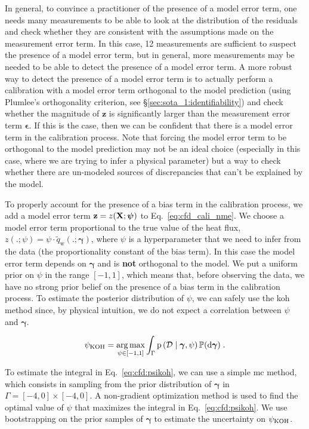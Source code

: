 \smallskip
In general, to convince a practitioner of the presence of a model error term, one needs many measurements to be able to look at the distribution of the residuals and check whether they are consistent with the assumptions made on the measurement error term. In this case, 12 measurements are sufficient to suspect the presence of a model error term, but in general, more measurements may be needed to be able to detect the presence of a model error term. A more robust way to detect the presence of a model error term is to actually perform a calibration with a model error term orthogonal to the model prediction (using Plumlee's orthogonality criterion, see \S\ref{sec:sota_1:identifiability}) and check whether the magnitude of $\mathbf{z}$ is significantly larger than the measurement error term $\boldsymbol{\epsilon}$. If this is the case, then we can be confident that there is a model error term in the calibration process. Note that forcing the model error term to be orthogonal to the model prediction may not be an ideal choice (especially in this case, where we are trying to infer a physical parameter) but a way to check whether there are un-modeled sources of discrepancies that can't be explained by the model.


\bigskip
To properly account for the presence of a bias term in the calibration process, we add a model error term $\mathbf{z} = z(\mathbf{X}; \boldsymbol{\psi})$ to Eq.~\eqref{eq:cfd_cali_nme}. We choose a model error term proportional to the true value of the heat flux, $z(.; \psi) = \psi \cdot \tilde{q}_{\mathrm{w}}(.; \boldsymbol{\gamma})$, where $\psi$ is a hyperparameter that we need to infer from the data (the proportionality constant of the bias term). In this case the model error term depends on $\boldsymbol{\gamma}$ and is \textbf{not} orthogonal to the model. We put a uniform prior on $\psi$ in the range $[-1, 1]$, which means that, before observing the data, we have no strong prior belief on the presence of a bias term in the calibration process. To estimate the posterior distribution of $\psi$, we can safely use the \gls{koh} method since, by physical intuition, we do not expect a correlation between $\psi$ and $\boldsymbol{\gamma}$.

\begin{equation}
  \psi_{\text{KOH}} = \operatorname*{arg\,max}_{\psi \in [-1, 1]} \int_{\Gamma} \mathrm{p} \left( \mathcal{D} \mid \boldsymbol{\gamma}, \psi \right) \mathbb{P}(\text{d} \boldsymbol{\gamma}) \;.
  \label{eq:cfd:psikoh}
\end{equation}

To estimate the integral in Eq.~\eqref{eq:cfd:psikoh}, we can use a simple \gls{mc} method, which consists in sampling from the prior distribution of $\boldsymbol{\gamma}$ in $\Gamma = [-4,0] \times [-4,0]$. A non-gradient optimization method is used to find the optimal value of $\psi$ that maximizes the integral in Eq.~\eqref{eq:cfd:psikoh}. We use bootstrapping on the prior samples of $\boldsymbol{\gamma}$ to estimate the uncertainty on $\psi_{\text{KOH}}$.

